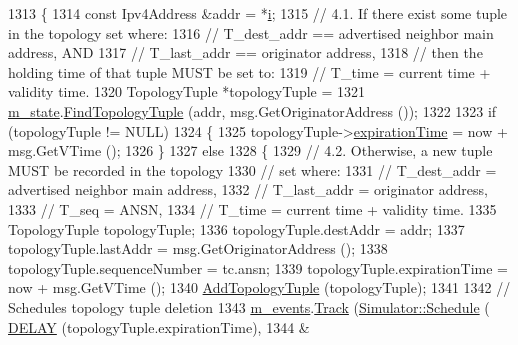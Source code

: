 \begin{DoxyCode}
1313     \{
1314       \textcolor{keyword}{const} Ipv4Address &addr = *\hyperlink{bernuolliDistribution_8m_a6f6ccfcf58b31cb6412107d9d5281426}{i};
1315       \textcolor{comment}{// 4.1. If there exist some tuple in the topology set where:}
1316       \textcolor{comment}{//      T\_dest\_addr == advertised neighbor main address, AND}
1317       \textcolor{comment}{//      T\_last\_addr == originator address,}
1318       \textcolor{comment}{// then the holding time of that tuple MUST be set to:}
1319       \textcolor{comment}{//      T\_time      =  current time + validity time.}
1320       TopologyTuple *topologyTuple =
1321         \hyperlink{classns3_1_1olsr_1_1RoutingProtocol_a07942ec1a7df71b609c8d2ff3b567c49}{m\_state}.\hyperlink{classns3_1_1olsr_1_1OlsrState_a9f2882a2443c4bbcaeea3e92d178b960}{FindTopologyTuple} (addr, msg.GetOriginatorAddress ());
1322 
1323       \textcolor{keywordflow}{if} (topologyTuple != NULL)
1324         \{
1325           topologyTuple->\hyperlink{structns3_1_1olsr_1_1TopologyTuple_ac567bb92fd21ca445e202dcec2538ecb}{expirationTime} = now + msg.GetVTime ();
1326         \}
1327       \textcolor{keywordflow}{else}
1328         \{
1329           \textcolor{comment}{// 4.2. Otherwise, a new tuple MUST be recorded in the topology}
1330           \textcolor{comment}{// set where:}
1331           \textcolor{comment}{//      T\_dest\_addr = advertised neighbor main address,}
1332           \textcolor{comment}{//      T\_last\_addr = originator address,}
1333           \textcolor{comment}{//      T\_seq       = ANSN,}
1334           \textcolor{comment}{//      T\_time      = current time + validity time.}
1335           TopologyTuple topologyTuple;
1336           topologyTuple.destAddr = addr;
1337           topologyTuple.lastAddr = msg.GetOriginatorAddress ();
1338           topologyTuple.sequenceNumber = tc.ansn;
1339           topologyTuple.expirationTime = now + msg.GetVTime ();
1340           \hyperlink{classns3_1_1olsr_1_1RoutingProtocol_a4c151dc96f3b7208d03be261a2ada627}{AddTopologyTuple} (topologyTuple);
1341 
1342           \textcolor{comment}{// Schedules topology tuple deletion}
1343           \hyperlink{classns3_1_1olsr_1_1RoutingProtocol_a80368d3da46150cf3fc9139c40f33d53}{m\_events}.\hyperlink{classns3_1_1EventGarbageCollector_a4f26a1f6e9a09e648eb31b46acd85144}{Track} (\hyperlink{classns3_1_1Simulator_a671882c894a08af4a5e91181bf1eec13}{Simulator::Schedule} (
      \hyperlink{olsr-routing-protocol_8cc_ad0a00c3386c4a24278b3b710ae798220}{DELAY} (topologyTuple.expirationTime),
1344                                                &

\end{DoxyCode}
